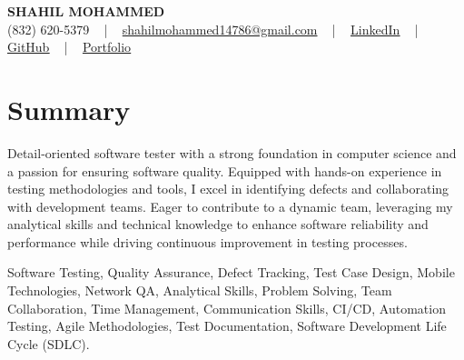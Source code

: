 \documentclass[letterpaper,10pt]{article}
\begin{document}
\begin{center}
    {\fontsize{14pt}{12pt}\selectfont \textbf{\MakeUppercase{Shahil Mohammed}}}\\ \vspace{2pt}
    \fontsize{10pt}{12pt}\selectfont (832) 620-5379 ~ | ~ \href{mailto:shahilmohammed14786@gmail.com}{shahilmohammed14786@gmail.com} ~ | ~  
    \href{https://www.linkedin.com/in/shahil-mohammed-9652931a1/}{\color{blue}\underline{LinkedIn}}  ~ | ~ 
    \href{https://github.com/freakbeast14}{\color{blue}\underline{GitHub}} ~ | ~ 
    \href{https://shahil-mohammed.netlify.app/}{\color{blue}\underline{Portfolio}}
    \vspace{-8pt}
\end{center}

\section{Summary}
\vspace{-2pt}\fontsize{8pt}{9pt}\selectfont
Detail-oriented software tester with a strong foundation in computer science and a passion for ensuring software quality. Equipped with hands-on experience in testing methodologies and tools, I excel in identifying defects and collaborating with development teams. Eager to contribute to a dynamic team, leveraging my analytical skills and technical knowledge to enhance software reliability and performance while driving continuous improvement in testing processes.
 \vspace{-5pt}
 
{\fontsize{1pt}{1pt}\selectfont\color{white}
Software Testing, Quality Assurance, Defect Tracking, Test Case Design, Mobile Technologies, Network QA, Analytical Skills, Problem Solving, Team Collaboration, Time Management, Communication Skills, CI/CD, Automation Testing, Agile Methodologies, Test Documentation, Software Development Life Cycle (SDLC).
}
\vspace{-8pt}

\vspace{-2pt}
\end{document}
